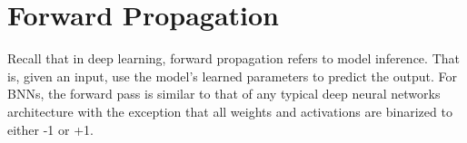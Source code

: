 %
%
%
%
%
%
%
%
%

\section{Forward Propagation}
Recall that in deep learning, forward propagation refers to model inference. That is, given an input, use the model's learned parameters to predict the output. For BNNs, the forward pass is similar to that of any typical deep neural networks architecture with the exception that all weights and activations are binarized to either -1 or +1. 

